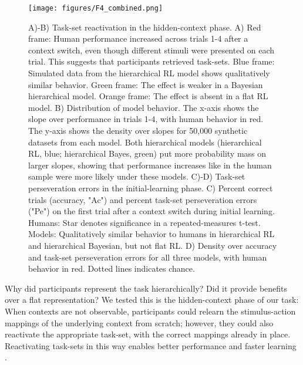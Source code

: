 \documentclass[10pt,letterpaper]{article}  %
\begin{document}
\begin{figure}%
    \begin{center}
	\texttt{[image: figures/F4\_combined.png]}
    \end{center}
    \caption{A)-B) Task-set reactivation in the hidden-context phase. A) Red frame: Human performance increased across trials 1-4 after a context switch, even though different stimuli were presented on each trial. This suggests that participants retrieved task-sets. Blue frame: Simulated data from the hierarchical RL model shows qualitatively similar behavior. Green frame: The effect is weaker in a Bayesian hierarchical model. Orange frame: The effect is absent in a flat RL model. B) Distribution of model behavior. The x-axis shows the slope over performance in trials 1-4, with human behavior in red. The y-axis shows the density over slopes for 50,000 synthetic datasets from each model. Both hierarchical models (hierarchical RL, blue; hierarchical Bayes, green) put more probability mass on larger slopes, showing that performance increases like in the human sample were more likely under these models. C)-D) Task-set perseveration errors in the initial-learning phase. C) Percent correct trials (accuracy, "Ac") and percent task-set perseveration errors ("Pe") on the first trial after a context switch during initial learning. Humans: Star denotes significance in a repeated-measures t-test. Models: Qualitatively similar behavior to humans in hierarchical RL and hierarchical Bayesian, but not flat RL. D) Density over accuracy and task-set perseveration errors for all three models, with human behavior in red. Dotted lines indicates chance.}
    \label{figure:F4_combined}
\end{figure}

Why did participants represent the task hierarchically? Did it provide benefits over a flat representation?
We tested this is the hidden-context phase of our task: When contexts are not observable, participants could relearn the stimulus-action mappings of the underlying context from scratch; however, they could also reactivate the appropriate task-set, with the correct mappings already in place. Reactivating task-sets in this way enables better performance and faster learning \cite{collins_reasoning_2012, donoso_foundations_2014, koechlin_prefrontal_2016}.
\end{document}
